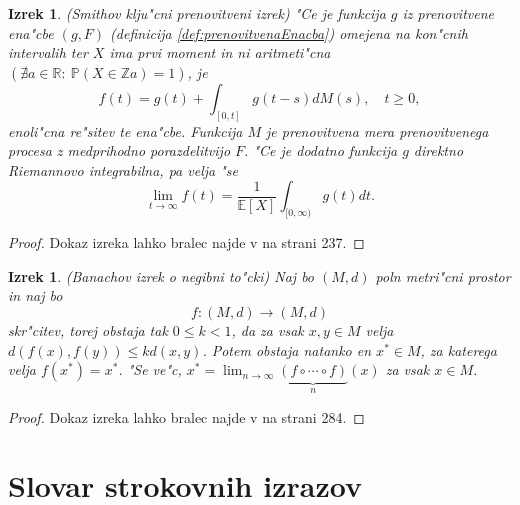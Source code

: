 \documentclass[12pt, a4paper, reqno]{amsart}
\theoremstyle{definition}
\theoremstyle{plain}
\newtheorem{izrek}[definicija]{Izrek}
\newcommand{\R}{\mathbb{R}}
\newcommand{\E}{\mathbb{E}}
\newcommand{\Prob}{\mathbb{P}}
\newcommand{\1}{\mathds{1}}
\begin{document}
    \begin{izrek}(Smithov klju"cni prenovitveni izrek)
        "Ce je funkcija $g$ iz prenovitvene ena"cbe $(g, F)$ (definicija \ref{def:prenovitvenaEnacba})
        omejena na kon"cnih intervalih ter $X$ ima prvi moment in ni aritmeti"cna 
        $(\nexists a\in\R: \ \Prob\left(X \in \mathbb{Z} a\right) = 1)$, je
        \begin{equation*}
            f(t) = g(t) +  \int_{[0, t]}g(t - s)dM(s), \quad t\geq 0,
        \end{equation*}
        enoli"cna re"sitev te ena"cbe. Funkcija $M$ je prenovitvena mera prenovitvenega procesa z medprihodno 
        porazdelitvijo $F$.
        "Ce je dodatno funkcija $g$ direktno Riemannovo integrabilna, pa velja "se
        \begin{equation*} 
            \lim_{t\to\infty}f(t) = \frac{1}{\E\left[X\right]}\int_{[0, \infty)}g(t)dt.
        \end{equation*}
        \label{izr:Smith}
    \end{izrek}

    \begin{proof}
        Dokaz izreka lahko bralec najde v \cite{8} na strani 237. 
    \end{proof}

    \begin{izrek}(Banachov izrek o negibni to"cki)
        Naj bo $(M, d)$ poln metri"cni prostor in naj bo 
        $$
            f:(M, d) \to (M, d)
        $$
        skr"citev, torej obstaja tak $0 \leq k < 1$, da za vsak $x, y \in M$ velja 
        $d(f(x), f(y)) \leq k d(x, y)$. Potem obstaja natanko en $x^*\in M$, za katerega velja $f(x^*) = x^*$. 
        "Se ve"c, $x^* = \lim_{n\to\infty}\underbrace{(f\circ \cdots \circ f)}_{n}(x)$ za vsak $x\in M$.
         \label{izr:Banach}
    \end{izrek}

    \begin{proof}
        Dokaz izreka lahko bralec najde v \cite{11} na strani 284.
    \end{proof}


\newpage
\section*{Slovar strokovnih izrazov}
\end{document}
